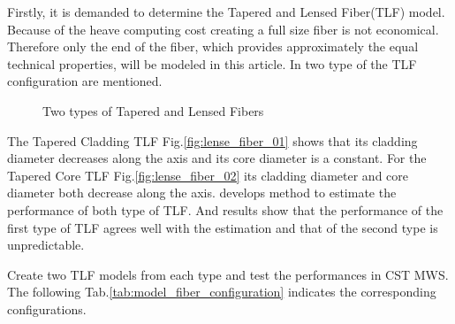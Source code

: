 

Firstly, it is demanded to determine the Tapered and Lensed Fiber(TLF) model. Because of the heave computing cost creating a full size fiber is not economical. Therefore only the end of the fiber, which provides approximately the equal technical properties, will be modeled in this article. In \cite{TLF_analysis} \cite{TLF_mode_transforming} two type of the TLF configuration are mentioned. 


\begin{figure}
\centering
{}
\hfill
{}
\label{fig:two_TLF}
\caption{Two types of Tapered and Lensed Fibers}
\end{figure}

The Tapered Cladding TLF Fig.\ref{fig:lense_fiber_01} shows that its cladding diameter decreases along the axis and its core diameter is a constant. For the Tapered Core TLF Fig.\ref{fig:lense_fiber_02} its cladding diameter and core diameter both decrease along the axis. \cite{TLF_mode_transforming} develops method to estimate the performance of both type of TLF.  And results show that the performance of the first type of TLF agrees well with the estimation and that of the second type is unpredictable. 

Create two TLF models from each type and test the performances in CST MWS. The following Tab.\ref{tab:model_fiber_configuration} indicates the corresponding configurations.

